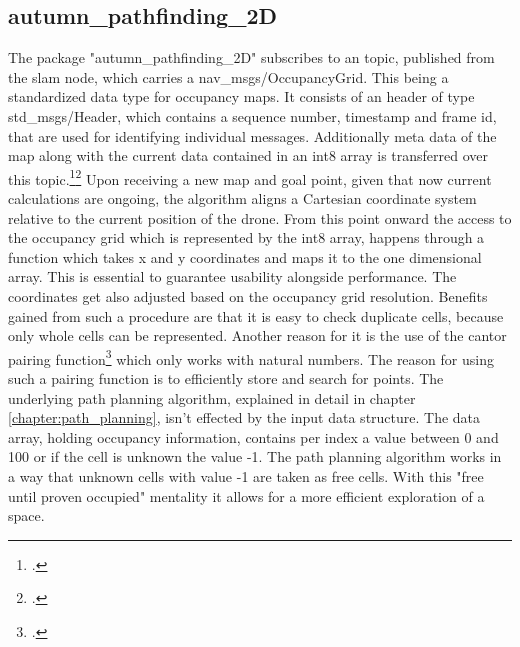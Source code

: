 \subsection{autumn\_pathfinding\_2D}
The package "autumn\_pathfinding\_2D" subscribes to an topic, published from the slam node, which carries a nav\_msgs/OccupancyGrid. This being a standardized data type for occupancy maps. It consists of an header of type std\_msgs/Header, which contains a sequence number, timestamp and frame id, that are used for identifying individual messages. Additionally meta data of the map along with the current data contained in an int8 array is transferred over this topic.\footcite{rosNavMsgsOccupancyGrid2021}\footcite{rosStdMsgsHeader2021}\newline
Upon receiving a new map and goal point, given that now current calculations are ongoing, the algorithm aligns a Cartesian coordinate system relative to the current position of the drone. From this point onward the access to the occupancy grid which is represented by the int8 array, happens through a function which takes x and y coordinates and maps it to the one dimensional array. This is essential to guarantee usability alongside performance.\newline
The coordinates get also adjusted based on the occupancy grid resolution. Benefits gained from such a procedure are that it is easy to check duplicate cells, because only whole cells can be represented. Another reason for it is the use of the cantor pairing function\footcite{Szudzik2017} which only works with natural numbers. The reason for using such a pairing function is to efficiently store and search for points.  
The underlying path planning algorithm, explained in detail in chapter \ref{chapter:path_planning}, isn't effected by the input data structure.       
The data array, holding occupancy information, contains per index a value between 0 and 100 or if the cell is unknown the value -1. The path planning algorithm works in a way that unknown cells with value -1 are taken as free cells. With this "free until proven occupied" mentality it allows for a more efficient exploration of a space.

